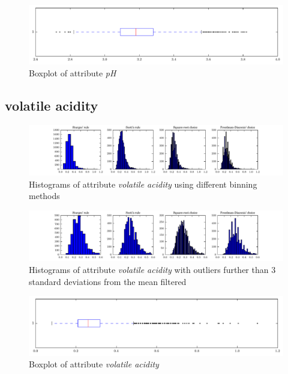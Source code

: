 \documentclass{report}
\begin{document}
\begin{figure}[H]
\includegraphics[width=\textwidth]{boxplots/pH.pdf}
\caption{Boxplot of attribute \emph{pH}}\end{figure}

\newpage\subsection{volatile acidity}
\begin{figure}[H]
\includegraphics[width=\textwidth]{histograms/volatile_acidity.pdf}
\caption{Histograms of attribute \emph{volatile acidity} using different binning methods}\end{figure}

\begin{figure}[H]
\includegraphics[width=\textwidth]{histograms/volatile_acidity_filtered.pdf}
\caption{Histograms of attribute \emph{volatile acidity} with outliers further than 3 standard deviations from the mean filtered}\n\end{figure}

\begin{figure}[H]
\includegraphics[width=\textwidth]{boxplots/volatile_acidity.pdf}
\caption{Boxplot of attribute \emph{volatile acidity}}\end{figure}
\end{document}
